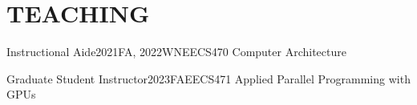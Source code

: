 \section{TEACHING}
    \resumeSubHeadingListStart
        \resumeSubheading
        {Instructional Aide}{2021FA, 2022WN}{EECS470 Computer Architecture}{}
        
        \resumeSubheading
        {Graduate Student Instructor}{2023FA}{EECS471 Applied Parallel Programming with GPUs}{}

            
    \resumeSubHeadingListEnd
